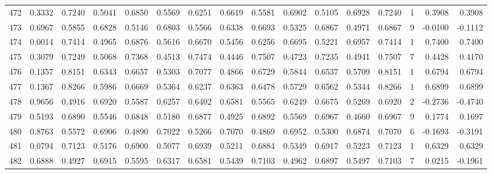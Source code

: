 \begin{tabular}{lrrrrrrrrrrrrrrr}
472 &      0.3332 &  0.7240 &  0.5041 &  0.6850 &  0.5569 &  0.6251 &  0.6619 &  0.5581 &  0.6902 &  0.5105 &   0.6928 &     0.7240 &      1 &                    0.3908 &                     0.3908 \\
473 &      0.6967 &  0.5855 &  0.6828 &  0.5146 &  0.6803 &  0.5566 &  0.6338 &  0.6693 &  0.5325 &  0.6867 &   0.4971 &     0.6867 &      9 &                   -0.0100 &                    -0.1112 \\
474 &      0.0014 &  0.7414 &  0.4965 &  0.6876 &  0.5616 &  0.6670 &  0.5456 &  0.6256 &  0.6695 &  0.5221 &   0.6957 &     0.7414 &      1 &                    0.7400 &                     0.7400 \\
475 &      0.3079 &  0.7249 &  0.5068 &  0.7368 &  0.4513 &  0.7474 &  0.4446 &  0.7507 &  0.4723 &  0.7235 &   0.4941 &     0.7507 &      7 &                    0.4428 &                     0.4170 \\
476 &      0.1357 &  0.8151 &  0.6343 &  0.6657 &  0.5303 &  0.7077 &  0.4866 &  0.6729 &  0.5844 &  0.6537 &   0.5709 &     0.8151 &      1 &                    0.6794 &                     0.6794 \\
477 &      0.1367 &  0.8266 &  0.5986 &  0.6669 &  0.5364 &  0.6237 &  0.6363 &  0.6478 &  0.5729 &  0.6562 &   0.5344 &     0.8266 &      1 &                    0.6899 &                     0.6899 \\
478 &      0.9656 &  0.4916 &  0.6920 &  0.5587 &  0.6257 &  0.6402 &  0.6581 &  0.5565 &  0.6249 &  0.6675 &   0.5269 &     0.6920 &      2 &                   -0.2736 &                    -0.4740 \\
479 &      0.5193 &  0.6890 &  0.5546 &  0.6848 &  0.5180 &  0.6877 &  0.4925 &  0.6892 &  0.5569 &  0.6967 &   0.4660 &     0.6967 &      9 &                    0.1774 &                     0.1697 \\
480 &      0.8763 &  0.5572 &  0.6906 &  0.4890 &  0.7022 &  0.5266 &  0.7070 &  0.4869 &  0.6952 &  0.5300 &   0.6874 &     0.7070 &      6 &                   -0.1693 &                    -0.3191 \\
481 &      0.0794 &  0.7123 &  0.5176 &  0.6900 &  0.5077 &  0.6939 &  0.5211 &  0.6884 &  0.5349 &  0.6917 &   0.5223 &     0.7123 &      1 &                    0.6329 &                     0.6329 \\
482 &      0.6888 &  0.4927 &  0.6915 &  0.5595 &  0.6317 &  0.6581 &  0.5439 &  0.7103 &  0.4962 &  0.6897 &   0.5497 &     0.7103 &      7 &                    0.0215 &                    -0.1961 \\

\end{tabular}

